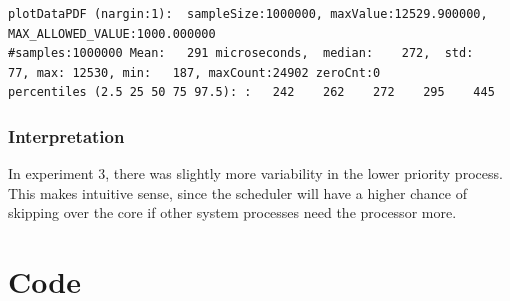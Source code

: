 \documentclass{article}
\begin{document}
\begin{lstlisting}
plotDataPDF (nargin:1):  sampleSize:1000000, maxValue:12529.900000,  MAX_ALLOWED_VALUE:1000.000000
#samples:1000000 Mean:   291 microseconds,  median:    272,  std:     77, max: 12530, min:   187, maxCount:24902 zeroCnt:0
percentiles (2.5 25 50 75 97.5): :   242    262    272    295    445	
\end{lstlisting}

\subsubsection{Interpretation}

In experiment 3, there was slightly more variability in the lower priority
process. This makes intuitive sense, since the scheduler will have a higher
chance of skipping over the core if other system processes need the processor
more.

\section{Code}










\end{document}
